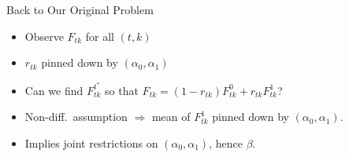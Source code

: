 \documentclass[handout]{beamer}
\begin{document}
\begin{frame}[noframenumbering]

\begin{figure}[h]
  \centering
\resizebox{0.85\textwidth}{!}{%
  
}
\end{figure}

\end{frame}
\begin{frame}

\begin{figure}[h]
  \centering
\resizebox{0.87\textwidth}{!}{%
  
}
\end{figure}


\end{frame}
\begin{frame}
  \begin{block}{Back to Our Original Problem}
    \small
    \vspace{-1em}
    \begin{itemize}
      \item Observe $F_{tk}$ for all $(t,k)$ 
      \item $r_{tk}$ pinned down by $(\alpha_0, \alpha_1)$
      \item Can we find $F_{tk}^{t^*}$ so that $F_{tk} = (1 - r_{tk})F_{tk}^0 + r_{tk} F_{tk}^1$?
      \item Non-diff.\ assumption $\Rightarrow$ mean of $F_{tk}^1$ pinned down by $(\alpha_0, \alpha_1)$.
      \item Implies joint restrictions on $(\alpha_0,\alpha_1)$, hence $\beta$.
    \end{itemize}
  \end{block}
\end{frame}
\end{document}
